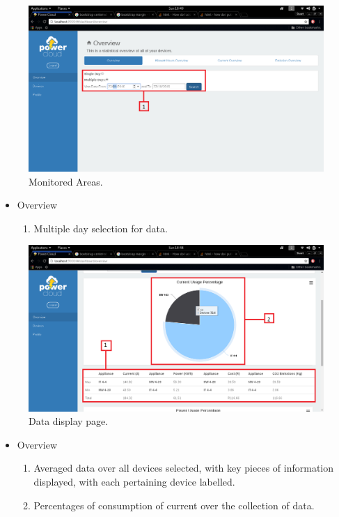 \documentclass[a4paper,10pt]{article}
\begin{document}
		\begin{figure}[H]
			\includegraphics[width=\textwidth]{images/Overview_multiple_day.png}
			\caption{Monitored Areas. \label{overflow}}
		\end{figure}
		\begin{itemize}
			\item Overview
			\begin{enumerate}
				\item Multiple day selection for data.
			\end{enumerate}
		\end{itemize}
		
		\begin{figure}[H]
			\includegraphics[width=\textwidth]{images/Overview_CurrentPie_Table.png}
			\caption{Data display page. \label{overflow}}
		\end{figure}
		\begin{itemize}
			\item Overview
			\begin{enumerate}
				\item Averaged data over all devices selected, with key pieces of information 
				displayed, with each pertaining device labelled.
				\item Percentages of consumption of current over the collection of data.
			\end{enumerate}
		\end{itemize}
		
\end{document}
